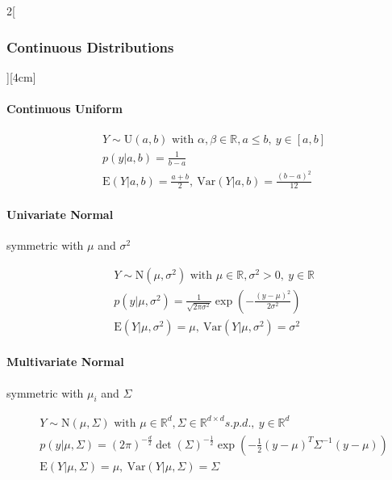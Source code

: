 \documentclass[8pt]{extarticle}
\begin{document}
\begin{multicols}{2}[\subsubsection{Continuous Distributions}][4cm]

	\paragraph{Continuous Uniform}
  
    \begin{align*}
    & Y \sim \mathrm{U}(a,b) \text{ with } \alpha, \beta \in \mathbb{R}, a \le b,\: y \in \left[a,b\right] \\
    & p(y|a,b) =\frac{1}{b-a} \\
    & \mathrm{E}(Y|a,b) = \frac{a+b}{2} ,\: \mathrm{Var}(Y|a,b) = \frac{(b-a)^2}{12}
  \end{align*}
  
    \paragraph{Univariate Normal} symmetric with $\mu$ and $\sigma^2$
  
    \begin{align*}
    & Y \sim \mathrm{N}(\mu, \sigma^2) \text{ with } \mu \in \mathbb{R}, \sigma^2 > 0,\: y \in \mathbb{R} \\
    & p(y|\mu, \sigma^2) =\frac{1}{\sqrt{2\pi\sigma^2}} \exp \left(-\frac{(y-\mu)^2}{2 \sigma^2} \right) \\
    & \mathrm{E}(Y|\mu, \sigma^2) = \mu ,\: \mathrm{Var}(Y|\mu, \sigma^2) = \sigma^2
  \end{align*}
  
    \paragraph{Multivariate Normal} symmetric with $\mu_i$ and $\Sigma$
  
    \begin{align*}
    & Y \sim \mathrm{N}(\mu, \Sigma) \text{ with } \mu \in \mathbb{R}^d, \Sigma \in \mathbb{R}^{d\times d} s.p.d.,\: y \in \mathbb{R}^d \\
    & p(y|\mu, \Sigma) = (2\pi)^{-\frac{d}{2}} \det (\Sigma)^{-\frac{1}{2}} \exp \left( -\frac{1}{2}(y-\mu)^{T} \Sigma^{-1}(y-\mu)\right) \\
    & \mathrm{E}(Y|\mu, \Sigma) = \mu ,\: \mathrm{Var}(Y|\mu, \Sigma) = \Sigma
  \end{align*}
  

\end{multicols}
\end{document}
